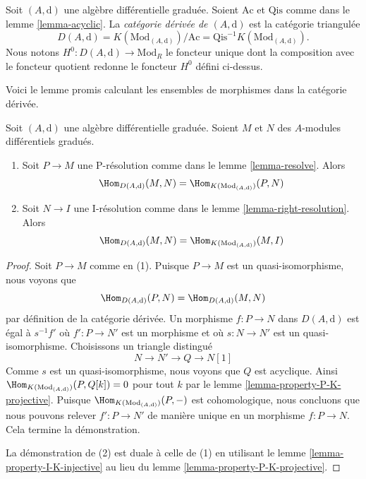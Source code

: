\begin{definition}
\label{definition-unbounded-derived-category}
Soit $(A, \text{d})$ une algèbre différentielle graduée.
Soient $\text{Ac}$ et $\text{Qis}$ comme dans le lemme
\ref{lemma-acyclic}. La {\it catégorie dérivée de $(A, \text{d})$} est la catégorie
triangulée
$$
D(A, \text{d}) =
K(\text{Mod}_{(A, \text{d})})/\text{Ac} =
\text{Qis}^{-1}K(\text{Mod}_{(A, \text{d})}).
$$
Nous notons $H^0 : D(A, \text{d}) \to \text{Mod}_R$ le foncteur unique
dont la composition avec le foncteur quotient redonne le foncteur
$H^0$ défini ci-dessus.
\end{definition}

\noindent
Voici le lemme promis calculant les ensembles de morphismes dans
la catégorie dérivée.

\begin{lemma}
\label{lemma-hom-derived}
Soit $(A, \text{d})$ une algèbre différentielle graduée.
Soient $M$ et $N$ des $A$-modules différentiels gradués.
\begin{enumerate}
\item Soit $P \to M$ une P-résolution comme dans
le lemme \ref{lemma-resolve}. Alors
$$
\Hom_{D(A, \text{d})}(M, N) =
\Hom_{K(\text{Mod}_{(A, \text{d})})}(P, N)
$$
\item Soit $N \to I$ une I-résolution comme dans
le lemme \ref{lemma-right-resolution}. Alors
$$
\Hom_{D(A, \text{d})}(M, N) =
\Hom_{K(\text{Mod}_{(A, \text{d})})}(M, I)
$$
\end{enumerate}
\end{lemma}

\begin{proof}
Soit $P \to M$ comme en (1). Puisque $P \to M$ est un quasi-isomorphisme, nous voyons que
$$
\Hom_{D(A, \text{d})}(P, N) = \Hom_{D(A, \text{d})}(M, N)
$$
par définition de la catégorie dérivée. Un
morphisme $f : P \to N$ dans $D(A, \text{d})$ est égal à
$s^{-1}f'$ où $f' : P \to N'$ est un morphisme et où
$s : N \to N'$ est un quasi-isomorphisme. Choisissons un triangle distingué
$$
N \to N' \to Q \to N[1]
$$
Comme $s$ est un quasi-isomorphisme, nous voyons que $Q$ est acyclique.
Ainsi $\Hom_{K(\text{Mod}_{(A, \text{d})})}(P, Q[k]) = 0$ pour tout $k$ par le
lemme \ref{lemma-property-P-K-projective}. Puisque
$\Hom_{K(\text{Mod}_{(A, \text{d})})}(P, -)$ est
cohomologique, nous concluons que nous pouvons relever $f' : P \to N'$ de manière
unique en un morphisme $f : P \to N$. Cela termine la démonstration.

\medskip\noindent
La démonstration de (2) est duale à celle de (1) en
utilisant le lemme \ref{lemma-property-I-K-injective} au
lieu du lemme \ref{lemma-property-P-K-projective}.
\end{proof}

